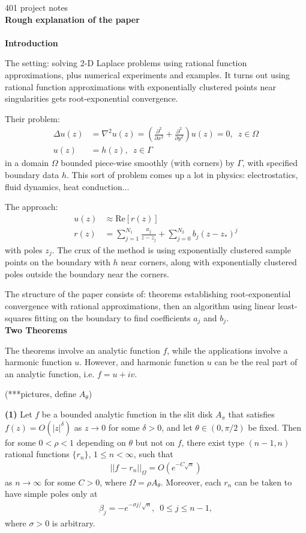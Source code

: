 \documentclass[12]{article}
\begin{document}
401 project notes\\
\large
\textbf{Rough explanation of the paper}\\ \\ \normalsize
\textbf{Introduction}

	The setting: solving 2-D Laplace problems using rational function approximations, plus numerical experiments and examples.
	It turns out using rational function approximations with exponentially clustered points near singularities gets root-exponential convergence.
	
	Their problem:
	\begin{align*}
	\Delta u(z) &= \nabla^2 u(z) = \left( \frac{\partial^2}{\partial x^2} + \frac{\partial^2}{\partial y^2}\right)u(z) = 0,\enspace z\in \Omega \\ 		u(z)&=h(z),\enspace z\in \Gamma
	\end{align*}
in a domain $\Omega$ bounded piece-wise smoothly (with corners) by $\Gamma$, with specified boundary data $h$. This sort of problem comes up a lot in physics: electrostatics, fluid dynamics, heat conduction...
	
	The approach:
	\begin{align*}
	u(z)&\approx \mathrm{Re}[r(z)] \\
	r(z) &= \sum_{j=1}^{N_1} \frac{a_j}{z-z_j} + \sum_{j=0}^{N_2} b_j (z-z_*)^j
	\end{align*}
with poles ${z_j}$. The crux of the method is using exponentially clustered sample points on the boundary with $h$ near corners, along with exponentially clustered poles outside the boundary near the corners.
	
	The structure of the paper consists of: theorems establishing root-exponential convergence with rational approximations, then an algorithm using linear least-squares fitting on the boundary to find coefficients $a_j$ and $b_j$. \\ 
	
\noindent
\textbf{Two Theorems}

	The theorems involve an analytic function $f$, while the applications involve a harmonic function $u$. However, and harmonic function $u$ can be the real part of an analytic function, i.e. $f=u+i v$.
	
	(***pictures, define $A_\theta$)
	
	\textbf{(1)} Let $f$ be a bounded analytic function in the slit disk $A_\pi$ that satisfies $f(z)=O(|z|^\delta)$ as $z \to 0$ for some $\delta > 0$, and let $\theta \in (0,\pi /2)$ be fixed. Then for some $0< \rho < 1$ depending on $\theta$ but not on $f$, there exist type $(n-1,n)$ rational functions $\{r_n\}$, $1 \leq n < \infty$, such that
	\begin{align*}
	||f-r_n||_\Omega = O(e^{-C \sqrt{n}})
	\end{align*}
as $n \to \infty $ for some $C>0$, where $\Omega = \rho A_\theta$. Moreover, each $r_n$ can be taken to have simple poles only at
	\begin{align*}
	\beta_j = -e^{-\sigma j/\sqrt{n}}, \enspace 0\leq j \leq n-1,
	\end{align*}
where $\sigma >0$ is arbitrary.
	
\end{document}
